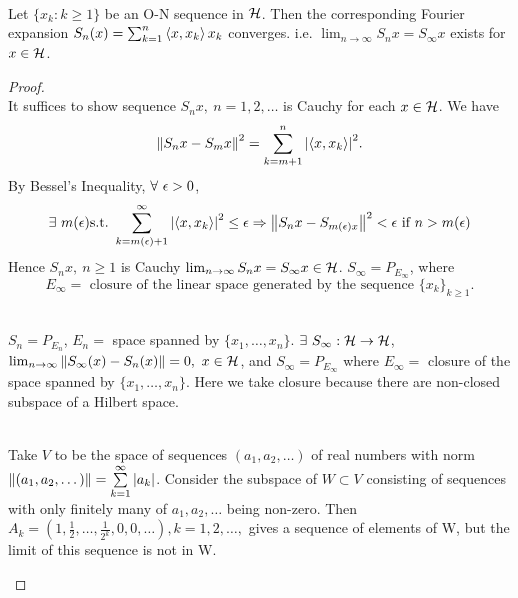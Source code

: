 \vspace{6pt}
\begin{theorem}\ \\
Let $\{x_k: k \geq 1\}$ be an O-N sequence in $\mathcal{H}$. Then the corresponding Fourier expansion $S_n(x) = \sum_{k = 1}^n \left\langle x, x_k \right\rangle x_k$ converges. i.e. $\lim_{n \to \infty} S_n x = S_\infty x$ exists for $x \in \mathcal{H}$. 
\end{theorem}
\begin{proof}\ \\
It suffices to show sequence $S_n x,\ n = 1,2,\dots$ is Cauchy for each $x \in \mathcal{H}$. We have 
$$\norm{S_n x - S_m x}^2 = \sum_{k = m+1}^n \abs{\left\langle x, x_k \right\rangle}^2.$$ 
By Bessel's Inequality, $\forall\ \epsilon > 0$, 
\begin{equation*}
    \exists\ m(\epsilon) \mathrm{s.t.}\  \sum_{k = m(\epsilon) + 1}^\infty \abs{\left\langle x, x_k \right\rangle}^2 \leq \epsilon \Rightarrow \norm{S_n x - S_{m(\epsilon)x}}^2 < \epsilon \text{ if } n > m(\epsilon)
\end{equation*} 
Hence $S_n x,\ n \geq 1$ is Cauchy \imply $\lim_{n \to \infty} S_n x = S_\infty x \in \mathcal{H}$. $S_\infty = P_{E_\infty}$, where $$E_\infty = \text{ closure of the linear space generated by the sequence } \{x_k\}_{k \geq 1}.$$
\begin{remark}\ \\
    $S_n = P_{E_n}$, $E_n = $ space spanned by $\{x_1,\dots,x_n\}$. $\exists\ S_\infty: \mathcal{H} \to \mathcal{H}$, $\lim_{n \to \infty} \norm{S_\infty (x) - S_n(x)} = 0,\ x \in \mathcal{H}$, and $S_\infty = P_{E_\infty}$ where $E_\infty = $ closure of the space spanned by $\{x_1,\dots,x_n\}$. Here we take closure because there are non-closed subspace of a Hilbert space.
\end{remark}
\begin{example}\ \\
Take $V$ to be the space of sequences $(a_1,a_2,\dots)$ of real numbers with norm $\norm{(a_1,a_2,\dots)} = \sum\limits_{k=1}^{\infty} \abs{a_k}$. Consider the subspace of $W \subset V $ consisting of sequences with only finitely many of $a_1,a_2,\dots$ being non-zero. Then $A_k=(1,\frac{1}{2},\dots,\frac{1}{2^k},0,0,\dots), k=1,2,\dots,$ gives a sequence of elements of W, but the limit of this sequence is not in W.
\end{example}
\end{proof}



